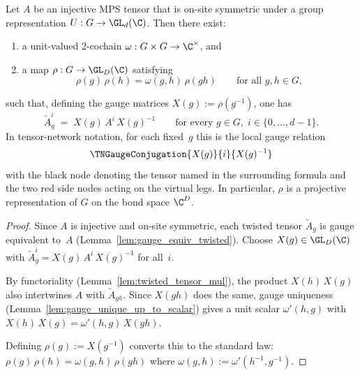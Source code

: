 \begin{theorem}%
    \label{thm:virtual_rep_injective}
    \leanok
    Let $A$ be an injective MPS tensor that is on-site symmetric
    under a group representation $U : G \to \GL_d(\C)$.
    Then there exist:
    \begin{enumerate}
        \item a unit-valued 2-cochain
              $\omega : G \times G \to \C^{\times}$, and
        \item a map $\rho : G \to \GL_D(\C)$ satisfying
              \[
                  \rho(g)\, \rho(h) = \omega(g,h)\, \rho(gh)
                  \qquad \text{for all } g, h \in G,
              \]
    \end{enumerate}
    such that, defining the gauge matrices $X(g) := \rho(g^{-1})$,
    one has
    \[
        \widetilde{A}_g^i \;=\; X(g)\, A^i\, X(g)^{-1}
        \qquad \text{for every } g \in G,\; i \in \{0,\ldots,d{-}1\}.
    \]
    In tensor-network notation, for each fixed~$g$ this is the local gauge
    relation
    \[
        \TNGaugeConjugation{X(g)}{i}{X(g)^{-1}}
    \]
    with the black node denoting the tensor named in the surrounding
    formula and the two red side nodes acting on the virtual legs.
    In particular, $\rho$ is a projective representation of $G$ on the
    bond space $\C^D$.
\end{theorem}

\begin{proof}
    \leanok
    Since $A$ is injective and on-site symmetric, each twisted tensor
    $\widetilde{A}_g$ is gauge equivalent to~$A$
    (Lemma~\ref{lem:gauge_equiv_twisted}).
    Choose $X(g) \in \GL_D(\C)$ with
    $\widetilde{A}_g^i = X(g)\, A^i\, X(g)^{-1}$ for all~$i$.

    By functoriality (Lemma~\ref{lem:twisted_tensor_mul}), the product
    $X(h)\, X(g)$ also intertwines $A$ with $\widetilde{A}_{gh}$.
    Since $X(gh)$ does the same, gauge uniqueness
    (Lemma~\ref{lem:gauge_unique_up_to_scalar}) gives a unit scalar
    $\omega'(h,g)$ with $X(h)\, X(g) = \omega'(h,g)\, X(gh)$.

    Defining $\rho(g) := X(g^{-1})$ converts this to the standard law:
    $\rho(g)\, \rho(h) = \omega(g,h)\, \rho(gh)$
    where $\omega(g,h) := \omega'(h^{-1}, g^{-1})$.
\end{proof}


